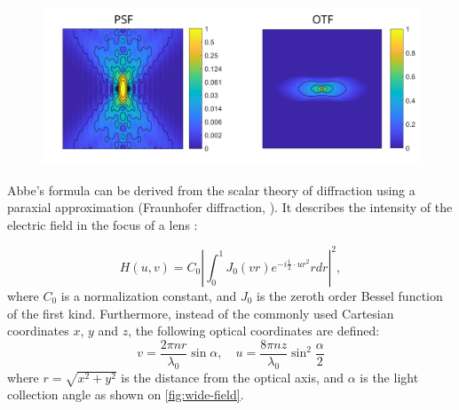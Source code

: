     \begin{figure}
      \centering
      \includegraphics[width=1\textwidth]{psfs/WF.pdf}
      \label{fig:psf-wf}
    \end{figure}


    Abbe's formula can be derived from the scalar theory of diffraction using a paraxial approximation (Fraunhofer diffraction, \cite{born_principles_2013}). It describes the intensity of the electric field in the focus of a lens \cite{sheppard_imaging_1987}:

    \begin{equation}
      H(u,v) = C_0 \left| \int_0^1 J_0 (vr)e^{-i\frac{1}{2}\cdot ur^2} rdr \right|^2,
      \label{eq:psf}
    \end{equation}
    where $C_0$ is a normalization constant, and $J_0$ is the zeroth order Bessel function of the first kind. Furthermore, instead of the commonly used Cartesian coordinates $x$, $y$ and $z$, the following optical coordinates are defined:
    \begin{equation}
      v = \frac{2\pi n  r}{\lambda_0} \sin \alpha, \quad
      u=\frac{8\pi n  z}{\lambda_0} \sin^2 \frac{\alpha}{2}
      \label{eq:substitutions}
    \end{equation}
    where $r = \sqrt{x^2 + y^2}$ is the distance from the optical axis, and $\alpha$ is the light collection angle as shown on \autoref{fig:wide-field}. 

